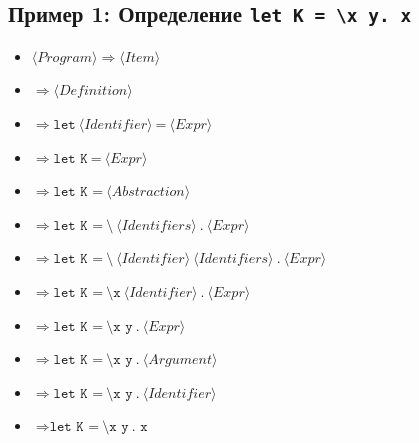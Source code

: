 \documentclass{article}
\begin{document}
\subsection{Пример 1: Определение \texttt{let K = \textbackslash x y. x}}
\begin{itemize}
    \item $\langle Program \rangle \Rightarrow \langle Item \rangle$
    \item $\Rightarrow \langle Definition \rangle$
    \item $\Rightarrow \texttt{let} \ \langle Identifier \rangle \ \texttt{=} \ \langle Expr \rangle$
    \item $\Rightarrow \texttt{let K} \ \texttt{=} \ \langle Expr \rangle$
    \item $\Rightarrow \texttt{let K =} \ \langle Abstraction \rangle$
    \item $\Rightarrow \texttt{let K =} \ \texttt{\textbackslash} \ \langle Identifiers \rangle \ \texttt{.} \ \langle Expr \rangle$
    \item $\Rightarrow \texttt{let K =} \ \texttt{\textbackslash} \ \langle Identifier \rangle \ \langle Identifiers \rangle \ \texttt{.} \ \langle Expr \rangle$
    \item $\Rightarrow \texttt{let K =} \ \texttt{\textbackslash x} \ \langle Identifier \rangle \ \texttt{.} \ \langle Expr \rangle$
    \item $\Rightarrow \texttt{let K =} \ \texttt{\textbackslash x y} \ \texttt{.} \ \langle Expr \rangle$
    \item $\Rightarrow \texttt{let K =} \ \texttt{\textbackslash x y} \ \texttt{.} \ \langle Argument \rangle$
    \item $\Rightarrow \texttt{let K =} \ \texttt{\textbackslash x y} \ \texttt{.} \ \langle Identifier \rangle$
    \item $\Rightarrow \texttt{let K =} \ \texttt{\textbackslash x y} \ \texttt{. x}$
\end{itemize}
\end{document}
